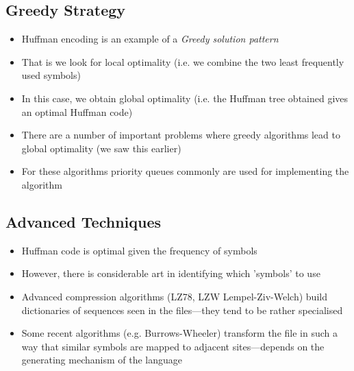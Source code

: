 
\begin{slide}
\section{Greedy Strategy}

\begin{PauseHighLight}
  \begin{itemize}
  \item Huffman encoding is an example of a \emph{Greedy solution
      pattern}\pause
  \item That is we look for local optimality (i.e. we combine the two
    least frequently used symbols)\pause
  \item In this case, we obtain global optimality (i.e. the Huffman tree
    obtained gives an optimal Huffman code)\pause
  \item There are a number of important problems where greedy algorithms
    lead to global optimality (we saw this earlier)\pause
  \item For these algorithms priority queues commonly are used for
    implementing the algorithm\pause
  \end{itemize}
\end{PauseHighLight}

\end{slide}


\begin{slide}
\section{Advanced Techniques}

\begin{PauseHighLight}
  \begin{itemize}
  \item Huffman code is optimal given the frequency of symbols\pause
  \item However, there is considerable art in identifying which
    'symbols' to use\pause
  \item Advanced compression algorithms (LZ78, LZW Lempel-Ziv-Welch) build
    dictionaries of sequences seen in the files---they tend to be rather
    specialised\pause
  \item Some recent algorithms (e.g. Burrows-Wheeler) transform the file
    in such a way that similar symbols are mapped to adjacent
    sites---depends on the generating mechanism of the language\pause
  \end{itemize}
\end{PauseHighLight}

\end{slide}

